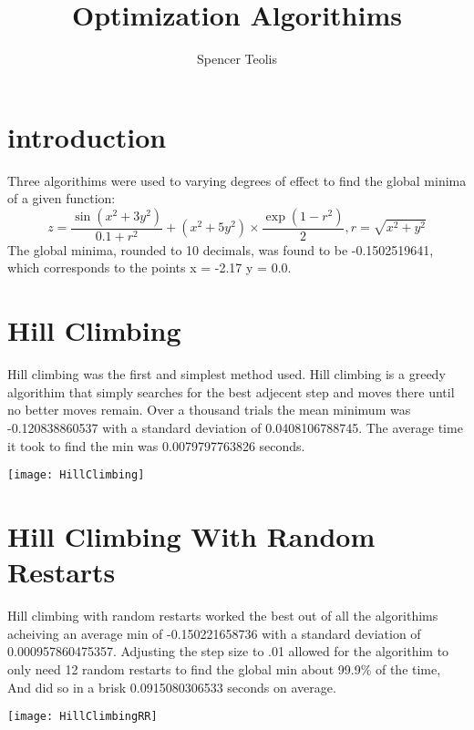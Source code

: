 \documentclass[12pt]{article}
\author{Spencer Teolis}
\title{Optimization Algorithims}
\date{}
\begin{document}
\begin{titlepage}
\maketitle
\end{titlepage}

\section{introduction}
Three algorithims were used to varying degrees of effect to find the global minima of a given function:
\begin{equation}
z = \dfrac{\sin(x^{2} + 3y^{2})}{0.1 + r^{2}} + (x^{2}+5y^{2}) \times \dfrac{\exp(1 - r^{2})}{2}, r = \sqrt{x^{2} + y^{2}}
\end{equation}
The global minima, rounded to 10 decimals, was found to be -0.1502519641, which corresponds to the points x = -2.17 y = 0.0.


\section{Hill Climbing}
Hill climbing was the first and simplest method used. Hill climbing is a greedy algorithim that simply searches for the best adjecent step and moves there until no better moves remain. Over a thousand trials the mean minimum was -0.120838860537 with a standard deviation of 0.0408106788745. The average time it took to find the min was 0.0079797763826 seconds. 


\texttt{[image: HillClimbing]}

\pagebreak

\section{Hill Climbing With Random Restarts}
Hill climbing with random restarts worked the best out of all the algorithims acheiving an average min of -0.150221658736 with a standard deviation of 0.000957860475357. Adjusting the step size to .01 allowed for the algorithim to only need 12 random restarts to find the global min about 99.9\% of the time, And did so in a brisk 0.0915080306533 seconds on average.

\texttt{[image: HillClimbingRR]}
\end{document}
